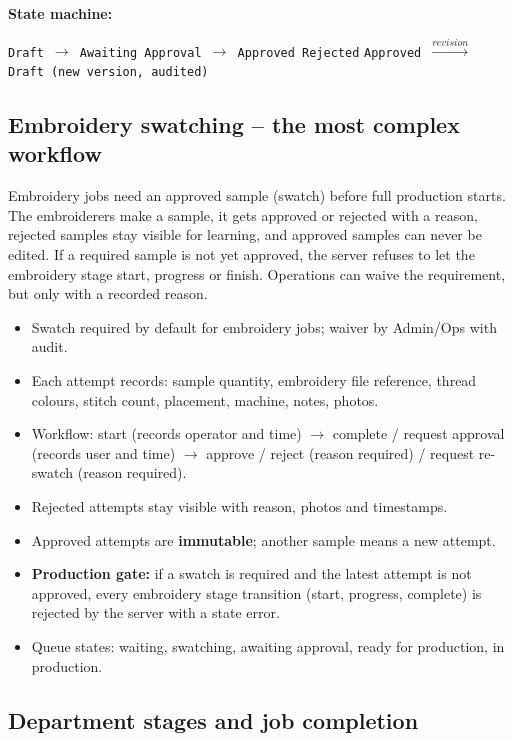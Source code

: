 \textbf{State machine:}
\begin{center}
  \texttt{Draft $\rightarrow$ Awaiting Approval $\rightarrow$ Approved \textbar{} Rejected}
  \qquad
  \texttt{Approved $\xrightarrow{revision}$ Draft (new version, audited)}
\end{center}

\subsection{Embroidery swatching -- the most complex workflow}

\begin{plainwords}
Embroidery jobs need an approved sample (swatch) before full production starts. The
embroiderers make a sample, it gets approved or rejected with a reason, rejected samples
stay visible for learning, and approved samples can never be edited. If a required sample
is not yet approved, the server refuses to let the embroidery stage start, progress or
finish. Operations can waive the requirement, but only with a recorded reason.
\end{plainwords}

\begin{itemize}
  \item Swatch required by default for embroidery jobs; waiver by Admin/Ops with audit.
  \item Each attempt records: sample quantity, embroidery file reference, thread colours,
        stitch count, placement, machine, notes, photos.
  \item Workflow: start (records operator and time) $\rightarrow$ complete / request
        approval (records user and time) $\rightarrow$ approve / reject (reason required)
        / request re-swatch (reason required).
  \item Rejected attempts stay visible with reason, photos and timestamps.
  \item Approved attempts are \textbf{immutable}; another sample means a new attempt.
  \item \textbf{Production gate:} if a swatch is required and the latest attempt is not
        approved, every embroidery stage transition (start, progress, complete) is
        rejected by the server with a state error.
  \item Queue states: waiting, swatching, awaiting approval, ready for production,
        in production.
\end{itemize}

\subsection{Department stages and job completion}

